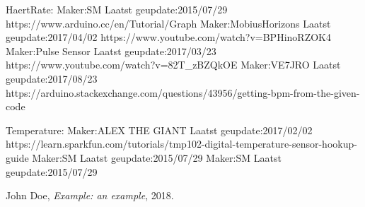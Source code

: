 \documentclass[a4paper]{report}
\begin{document}
HaertRate:
Maker:SM                  Laatst geupdate:2015/07/29      https://www.arduino.cc/en/Tutorial/Graph
Maker:MobiusHorizons      Laatst geupdate:2017/04/02      https://www.youtube.com/watch?v=BPHinoRZOK4
Maker:Pulse Sensor        Laatst geupdate:2017/03/23      https://www.youtube.com/watch?v=82T_zBZQkOE
Maker:VE7JRO              Laatst geupdate:2017/08/23      https://arduino.stackexchange.com/questions/43956/getting-bpm-from-the-given-code

Temperature:
Maker:ALEX THE GIANT      Laatst geupdate:2017/02/02      https://learn.sparkfun.com/tutorials/tmp102-digital-temperature-sensor-hookup-guide
Maker:SM                  Laatst geupdate:2015/07/29
Maker:SM                  Laatst geupdate:2015/07/29




\begin{thebibliography}{9}

  John Doe,
  \textit{Example: an example},
  2018.

\end{thebibliography}
\end{document}
